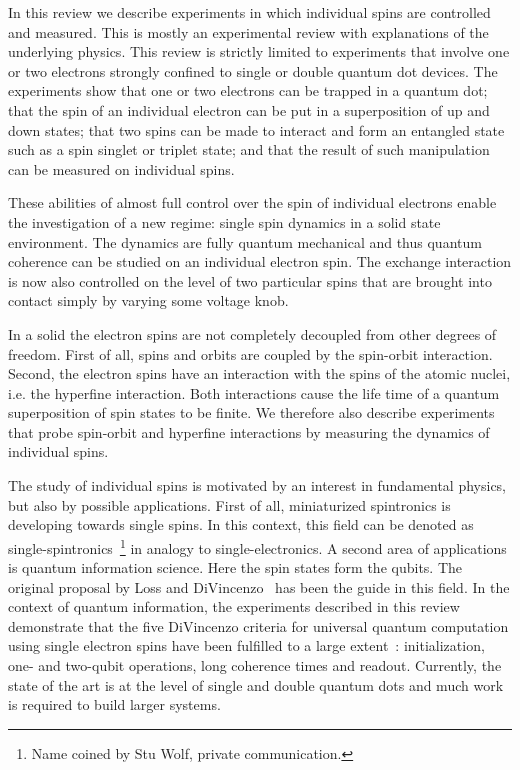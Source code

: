 \documentclass[rmp,twocolumn,aps]{revtex4}
\begin{document}
In this review we describe experiments in which individual spins
are controlled and measured. This is mostly an experimental review
with explanations of the underlying physics. This review is
strictly limited to experiments that involve one or two electrons
strongly confined to single or double quantum dot devices. The
experiments show that one or two electrons can be trapped in a
quantum dot; that the spin of an individual electron can be put in
a superposition of up and down states; that two spins can be made
to interact and form an entangled state such as a spin singlet or triplet state; and that the result of such manipulation can be measured on individual spins.

These abilities of almost full control over the spin of individual
electrons enable the investigation of a new regime: single spin
dynamics in a solid state environment. The dynamics are fully
quantum mechanical and thus quantum coherence can be studied on an
individual electron spin. The exchange interaction is now also
controlled on the level of two particular spins that are brought
into contact simply by varying some voltage knob.

In a solid the electron spins are not completely decoupled from
other degrees of freedom. First of all, spins and orbits are
coupled by the spin-orbit interaction. Second, the electron spins
have an interaction with the spins of the atomic nuclei, i.e. the
hyperfine interaction. Both interactions cause the life time of a
quantum superposition of spin states to be finite. We therefore
also describe experiments that probe spin-orbit and hyperfine
interactions by measuring the dynamics of individual spins.

The study of individual spins is motivated by an interest in
fundamental physics, but also by possible applications. First of
all, miniaturized spintronics is developing towards single spins.
In this context, this field can be denoted as
single-spintronics~\footnote{Name coined by Stu Wolf, private communication.} in analogy to single-electronics.
A second area of applications is quantum information science. Here
the spin states form the qubits. The
original proposal by Loss and DiVincenzo~\cite{LossDiVincenzo} has
been the guide in this field. In the context of quantum
information, the experiments described in this review demonstrate
that the five DiVincenzo criteria for universal quantum
computation using single electron spins have been fulfilled to a large extent~\cite{DiVincenzo_criteria}:
initialization, one- and two-qubit operations, long coherence times
and readout. Currently, the state of the art is at the level of
single and double quantum dots and much work is required to build
larger systems.
\end{document}
